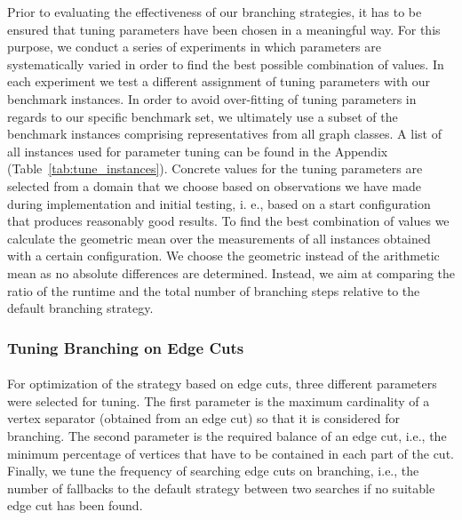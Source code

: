 \documentclass[12pt,a4paper,twoside]{scrartcl}
\numberwithin{equation}{section}
\begin{document}
Prior to evaluating the effectiveness of our branching strategies, it has to be ensured that tuning parameters have been chosen in a meaningful way. For this purpose, we conduct a series of experiments in which parameters are systematically varied in order to find the best possible combination of values. In each experiment we test a different assignment of tuning parameters with our benchmark instances. In order to avoid over-fitting of tuning parameters in regards to our specific benchmark set, we ultimately use a subset of the benchmark instances comprising representatives from all graph classes. A list of all instances used for parameter tuning can be found in the Appendix (Table~\ref{tab:tune_instances}). Concrete values for the tuning parameters are selected from a domain that we choose based on observations we have made during implementation and initial testing, i. e., based on a start configuration that produces reasonably good results. To find the best combination of values we calculate the geometric mean over the measurements of all instances obtained with a certain configuration. We choose the geometric instead of the arithmetic mean as no absolute differences are determined. Instead, we aim at comparing the ratio of the runtime and the total number of branching steps relative to the default branching strategy.

\subsubsection{Tuning Branching on Edge Cuts}
\paragraph{}
For optimization of the strategy based on edge cuts, three different parameters were selected for tuning. The first parameter is the maximum cardinality of a vertex separator (obtained from an edge cut) so that it is considered for branching. The second parameter is the required balance of an edge cut, i.e., the minimum percentage of vertices that have to be contained in each part of the cut. Finally, we tune the frequency of searching edge cuts on branching, i.e., the number of fallbacks to the default strategy between two searches if no suitable edge cut has been found.
\end{document}
